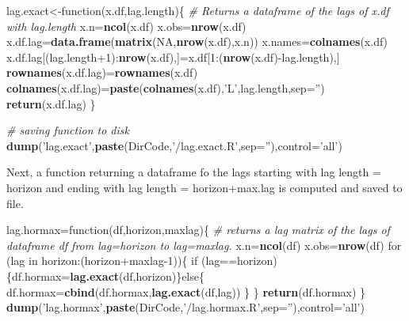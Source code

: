 \documentclass[]{article}
\newenvironment{Shaded}{\begin{snugshade}}{\end{snugshade}}
\newcommand{\KeywordTok}[1]{\textcolor[rgb]{0.13,0.29,0.53}{\textbf{{#1}}}}
\newcommand{\DataTypeTok}[1]{\textcolor[rgb]{0.13,0.29,0.53}{{#1}}}
\newcommand{\DecValTok}[1]{\textcolor[rgb]{0.00,0.00,0.81}{{#1}}}
\newcommand{\StringTok}[1]{\textcolor[rgb]{0.31,0.60,0.02}{{#1}}}
\newcommand{\CommentTok}[1]{\textcolor[rgb]{0.56,0.35,0.01}{\textit{{#1}}}}
\newcommand{\OtherTok}[1]{\textcolor[rgb]{0.56,0.35,0.01}{{#1}}}
\newcommand{\NormalTok}[1]{{#1}}
\begin{document}
\begin{Shaded}
\begin{Highlighting}[]
\NormalTok{lag.exact<-function(x.df,lag.length)\{}
        \CommentTok{# Returns a dataframe of the lags of x.df with lag.length}
        \NormalTok{x.n=}\KeywordTok{ncol}\NormalTok{(x.df)}
        \NormalTok{x.obs=}\KeywordTok{nrow}\NormalTok{(x.df)}
        \NormalTok{x.df.lag=}\KeywordTok{data.frame}\NormalTok{(}\KeywordTok{matrix}\NormalTok{(}\OtherTok{NA}\NormalTok{,}\KeywordTok{nrow}\NormalTok{(x.df),x.n))}
        \NormalTok{x.names=}\KeywordTok{colnames}\NormalTok{(x.df)}
        \NormalTok{x.df.lag[(lag.length}\DecValTok{+1}\NormalTok{):}\KeywordTok{nrow}\NormalTok{(x.df),]=x.df[}\DecValTok{1}\NormalTok{:(}\KeywordTok{nrow}\NormalTok{(x.df)-lag.length),]}
        \KeywordTok{rownames}\NormalTok{(x.df.lag)=}\KeywordTok{rownames}\NormalTok{(x.df)}
        \KeywordTok{colnames}\NormalTok{(x.df.lag)=}\KeywordTok{paste}\NormalTok{(}\KeywordTok{colnames}\NormalTok{(x.df),}\StringTok{'L'}\NormalTok{,lag.length,}\DataTypeTok{sep=}\StringTok{''}\NormalTok{)}
        \KeywordTok{return}\NormalTok{(x.df.lag)}
        \NormalTok{\}}

\CommentTok{# saving function to disk}
\KeywordTok{dump}\NormalTok{(}\StringTok{'lag.exact'}\NormalTok{,}\KeywordTok{paste}\NormalTok{(DirCode,}\StringTok{'/lag.exact.R'}\NormalTok{,}\DataTypeTok{sep=}\StringTok{''}\NormalTok{),}\DataTypeTok{control=}\StringTok{'all'}\NormalTok{)}
\end{Highlighting}
\end{Shaded}

Next, a function returning a dataframe fo the lags starting with lag
length = horizon and ending with lag length = horizon+max.lag is
computed and saved to file.

\begin{Shaded}
\begin{Highlighting}[]
\NormalTok{lag.hormax=function(df,horizon,maxlag)\{}
        \CommentTok{# returns a lag matrix of the lags of dataframe df from lag=horizon to lag=maxlag.}
        \NormalTok{x.n=}\KeywordTok{ncol}\NormalTok{(df)}
        \NormalTok{x.obs=}\KeywordTok{nrow}\NormalTok{(df)}
        \NormalTok{for (lag in horizon:(horizon+maxlag}\DecValTok{-1}\NormalTok{))\{}
                \NormalTok{if (lag==horizon)\{df.hormax=}\KeywordTok{lag.exact}\NormalTok{(df,horizon)\}else\{}
                        \NormalTok{df.hormax=}\KeywordTok{cbind}\NormalTok{(df.hormax,}\KeywordTok{lag.exact}\NormalTok{(df,lag))}
                        \NormalTok{\}}
                \NormalTok{\}}
        \KeywordTok{return}\NormalTok{(df.hormax)}
        \NormalTok{\}}
\KeywordTok{dump}\NormalTok{(}\StringTok{'lag.hormax'}\NormalTok{,}\KeywordTok{paste}\NormalTok{(DirCode,}\StringTok{'/lag.hormax.R'}\NormalTok{,}\DataTypeTok{sep=}\StringTok{''}\NormalTok{),}\DataTypeTok{control=}\StringTok{'all'}\NormalTok{)}
\end{Highlighting}
\end{Shaded}
\end{document}
